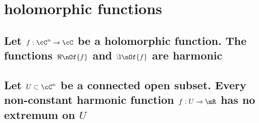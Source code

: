 \documentclass[11pt,a4paper]{scrartcl}
\begin{document}
	\section{holomorphic functions}
	\subsection{Let $f : \cC^n \to \cC$ be a holomorphic function.	The functions $\Re\nOf{f}$ and $\Im\nOf{f}$ are harmonic}
	\subsection{Let $U\subset \cC^n$ be a connected open subset. Every non-constant harmonic function $f : U \to \mR$ has no extremum on $U$}
\end{document}
